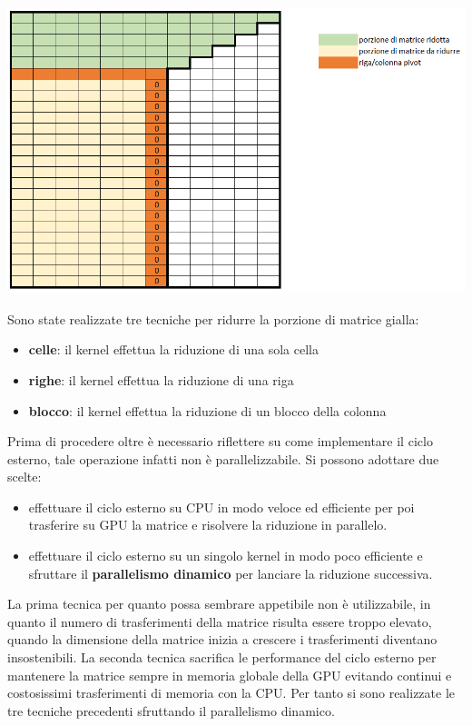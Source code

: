 \documentclass{article}
\begin{document}
	\begin{center}
		\includegraphics[width = \textwidth]{matrice.png}
		\label{fig:mat}
	\end{center}


Sono state realizzate tre tecniche per ridurre la porzione di matrice gialla:
\begin{itemize}
\item \textbf{celle}: il kernel effettua la riduzione di una sola cella
\item \textbf{righe}: il kernel effettua la riduzione di una riga 
\item \textbf{blocco}: il kernel effettua la riduzione di un blocco della colonna
\end{itemize}

\newpage
Prima di procedere oltre è necessario riflettere su come implementare il ciclo esterno, tale operazione infatti non è parallelizzabile. Si possono adottare due scelte:
\begin{itemize}
\item effettuare il ciclo esterno su CPU in modo veloce ed efficiente per poi trasferire su GPU la matrice e risolvere la riduzione in parallelo.
\item effettuare il ciclo esterno su un singolo kernel in modo poco efficiente e sfruttare il \textbf{parallelismo dinamico} per lanciare la riduzione successiva.
\end{itemize}

La prima tecnica per quanto possa sembrare appetibile non è utilizzabile, in quanto il numero di trasferimenti della matrice risulta essere troppo elevato, quando la dimensione della matrice inizia a crescere i trasferimenti diventano insostenibili. La seconda tecnica sacrifica le performance del ciclo esterno per mantenere la matrice sempre in memoria globale della GPU evitando continui e costosissimi trasferimenti di memoria con la CPU. Per tanto si sono realizzate le tre tecniche precedenti sfruttando il parallelismo dinamico.
\end{document}
